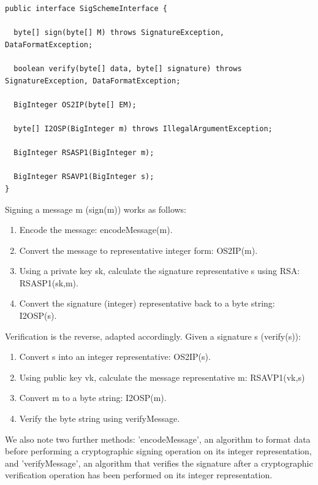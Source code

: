\documentclass[]{final_report}
\theoremstyle{definition}
\begin{document}
\begin{lstlisting}[caption=SigSchemeInterface Interface code] 
public interface SigSchemeInterface {

  byte[] sign(byte[] M) throws SignatureException, DataFormatException;

  boolean verify(byte[] data, byte[] signature) throws SignatureException, DataFormatException;

  BigInteger OS2IP(byte[] EM);

  byte[] I2OSP(BigInteger m) throws IllegalArgumentException;

  BigInteger RSASP1(BigInteger m);

  BigInteger RSAVP1(BigInteger s);
}
 \end{lstlisting}

Signing a message m (sign(m)) works as follows:
\begin{enumerate}
\item Encode the message: encodeMessage(m).

\item Convert the message to representative integer form: OS2IP(m).

\item Using a private key sk, calculate the signature representative s using RSA: RSASP1(sk,m).

\item Convert the signature (integer) representative back to a byte string: I2OSP(s).
\end{enumerate}

Verification is the reverse, adapted accordingly. Given a signature s (verify(s)):

\begin{enumerate}
\item Convert s into an integer representative: OS2IP(s).

\item Using public key vk, calculate the message representative m: RSAVP1(vk,s)

\item Convert m to a byte string: I2OSP(m).

\item Verify the byte string using verifyMessage.
\end{enumerate}

We also note two further methods: 'encodeMessage', an algorithm to format data before performing a cryptographic signing operation on its integer representation, and 'verifyMessage', an algorithm that verifies the signature after a cryptographic verification operation has been performed on its integer representation. 
 
\end{document}
